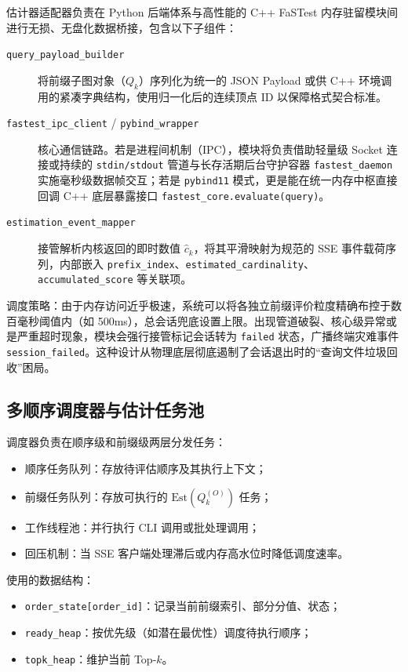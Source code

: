 \documentclass[12pt,a4paper]{article}
\begin{document}
估计器适配器负责在 Python 后端体系与高性能的 C++ FaSTest 内存驻留模块间进行无损、无盘化数据桥接，包含以下子组件：

\begin{description}
  \item[\texttt{query\_payload\_builder}] 将前缀子图对象（$Q_k$）序列化为统一的 JSON Payload 或供 C++ 环境调用的紧凑字典结构，使用归一化后的连续顶点 ID 以保障格式契合标准。

  \item[\texttt{fastest\_ipc\_client} / \texttt{pybind\_wrapper}] 核心通信链路。若是进程间机制（IPC），模块将负责借助轻量级 Socket 连接或持续的 \texttt{stdin/stdout} 管道与长存活期后台守护容器 \texttt{fastest\_daemon} 实施毫秒级数据帧交互；若是 \texttt{pybind11} 模式，更是能在统一内存中枢直接回调 C++ 底层暴露接口 \texttt{fastest\_core.evaluate(query)}。

  \item[\texttt{estimation\_event\_mapper}] 接管解析内核返回的即时数值 $\hat{c}_k$，将其平滑映射为规范的 SSE 事件载荷序列，内部嵌入 \texttt{prefix\_index}、\texttt{estimated\_cardinality}、\texttt{accumulated\_score} 等关联项。
\end{description}

调度策略：由于内存访问近乎极速，系统可以将各独立前缀评价粒度精确布控于数百毫秒阈值内（如 500ms），总会话兜底设置上限。出现管道破裂、核心级异常或是严重超时现象，模块会强行接管标记会话转为 \texttt{failed} 状态，广播终端灾难事件 \texttt{session\_failed}。这种设计从物理底层彻底遏制了会话退出时的“查询文件垃圾回收”困局。

\subsection{多顺序调度器与估计任务池}
\label{sec:multi-order-scheduler}

调度器负责在顺序级和前缀级两层分发任务：
\begin{itemize}
  \item 顺序任务队列：存放待评估顺序及其执行上下文；
  \item 前缀任务队列：存放可执行的 $\mathrm{Est}(Q_k^{(O)})$ 任务；
  \item 工作线程池：并行执行 CLI 调用或批处理调用；
  \item 回压机制：当 SSE 客户端处理滞后或内存高水位时降低调度速率。
\end{itemize}

使用的数据结构：
\begin{itemize}
  \item \texttt{order\_state[order\_id]}：记录当前前缀索引、部分分值、状态；
  \item \texttt{ready\_heap}：按优先级（如潜在最优性）调度待执行顺序；
  \item \texttt{topk\_heap}：维护当前 Top-$k$。
\end{itemize}
\end{document}

